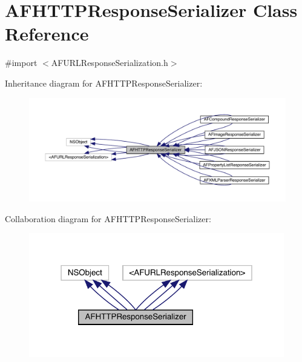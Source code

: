 \hypertarget{interface_a_f_h_t_t_p_response_serializer}{}\section{A\+F\+H\+T\+T\+P\+Response\+Serializer Class Reference}
\label{interface_a_f_h_t_t_p_response_serializer}


{\ttfamily \#import $<$A\+F\+U\+R\+L\+Response\+Serialization.\+h$>$}



Inheritance diagram for A\+F\+H\+T\+T\+P\+Response\+Serializer\+:\nopagebreak
\begin{figure}[H]
\begin{center}
\leavevmode
\includegraphics[width=350pt]{interface_a_f_h_t_t_p_response_serializer__inherit__graph}
\end{center}
\end{figure}


Collaboration diagram for A\+F\+H\+T\+T\+P\+Response\+Serializer\+:\nopagebreak
\begin{figure}[H]
\begin{center}
\leavevmode
\includegraphics[width=316pt]{interface_a_f_h_t_t_p_response_serializer__coll__graph}
\end{center}
\end{figure}
